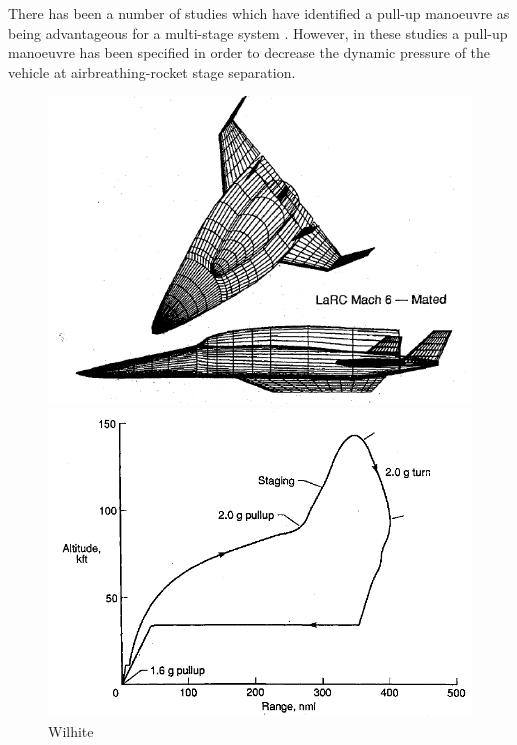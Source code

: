 There has been a number of studies which have identified a pull-up manoeuvre as being advantageous for a multi-stage system \cite{Tsuchiya2005,Wilhite1991,Mehta2001}. However, in these studies a pull-up manoeuvre has been specified in order to decrease the dynamic pressure of the vehicle at airbreathing-rocket stage separation. 
\begin{figure}
\centering
\begin{minipage}[b]{0.45\textwidth}
	\centering
	\includegraphics[width=\linewidth]{"figures/2_literature-review/Wilhite Booster Vehicle"}
	\caption{}
	\label{fig:WilhiteVehicle}
\end{minipage}	
\begin{minipage}[b]{0.45\textwidth}
\includegraphics[width=\linewidth]{"figures/2_literature-review/WilHite Booster Trajectory"}
\caption{Wilhite}
\label{fig:WilHiteTrajectory}
\end{minipage}
\end{figure}
